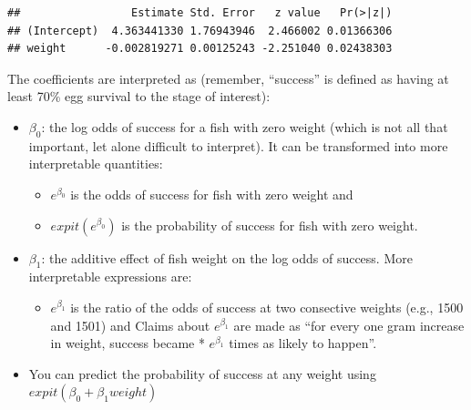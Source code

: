 \documentclass[]{book}
\newenvironment{Shaded}{\begin{snugshade}}{\end{snugshade}}
\newcommand{\KeywordTok}[1]{\textcolor[rgb]{0.13,0.29,0.53}{\textbf{#1}}}
\newcommand{\DataTypeTok}[1]{\textcolor[rgb]{0.13,0.29,0.53}{#1}}
\newcommand{\StringTok}[1]{\textcolor[rgb]{0.31,0.60,0.02}{#1}}
\newcommand{\OperatorTok}[1]{\textcolor[rgb]{0.81,0.36,0.00}{\textbf{#1}}}
\newcommand{\NormalTok}[1]{#1}
\providecommand{\tightlist}{%
  \setlength{\itemsep}{0pt}\setlength{\parskip}{0pt}}
\theoremstyle{definition}
\theoremstyle{definition}
\theoremstyle{definition}
\theoremstyle{remark}
\begin{document}
\begin{Shaded}
\end{Shaded}

\begin{verbatim}
##                 Estimate Std. Error   z value   Pr(>|z|)
## (Intercept)  4.363441330 1.76943946  2.466002 0.01366306
## weight      -0.002819271 0.00125243 -2.251040 0.02438303
\end{verbatim}

The coefficients are interpreted as (remember, ``success'' is defined as
having at least 70\% egg survival to the stage of interest):

\begin{itemize}
\tightlist
\item
  \(\beta_0\): the log odds of success for a fish with zero weight
  (which is not all that important, let alone difficult to interpret).
  It can be transformed into more interpretable quantities:

  \begin{itemize}
  \tightlist
  \item
    \(e^{\beta_0}\) is the odds of success for fish with zero weight and
  \item
    \(expit(e^{\beta_0})\) is the probability of success for fish with
    zero weight.
  \end{itemize}
\item
  \(\beta_1\): the additive effect of fish weight on the log odds of
  success. More interpretable expressions are:

  \begin{itemize}
  \tightlist
  \item
    \(e^{\beta_1}\) is the ratio of the odds of success at two
    consective weights (e.g., 1500 and 1501) and Claims about
    \(e^{\beta_1}\) are made as ``for every one gram increase in weight,
    success became * \(e^{\beta_1}\) times as likely to happen''.
  \end{itemize}
\item
  You can predict the probability of success at any weight using
  \(expit(\beta_0 + \beta_1 weight)\)
\end{itemize}
\end{document}
